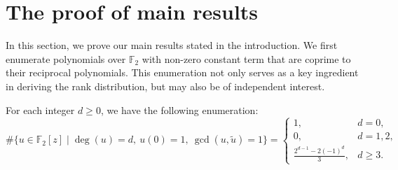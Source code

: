 \documentclass[hidelinks,onefignum,onetabnum]{siamart251216}
\theoremstyle{definition}
\theoremstyle{remark}
\begin{document}
\section{The proof of main results}\label{sec-dynamics}
In this section, we prove our main results stated in the introduction. We first enumerate polynomials over $\mathbb{F}_2$ with non-zero constant term that are coprime to their reciprocal polynomials. This enumeration not only serves as a key ingredient in deriving the rank distribution, but may also be of independent interest.



\begin{proposition}\label{enu of rational functions}
	For each integer $d\ge 0$, we have the following enumeration:
	\[
	\#\{u\in \mathbb F_2[z]\mid \deg(u)=d,\ u(0)=1,\ \gcd(u,\widetilde{u})=1\}
	=\begin{cases}
		1, & d=0,\\[2pt]
		0, & d=1,2,\\[2pt]
		\displaystyle\frac{2^{d-1}-2(-1)^{d}}{3}, & d\ge 3.
	\end{cases}
	\]
\end{proposition}
\end{document}
